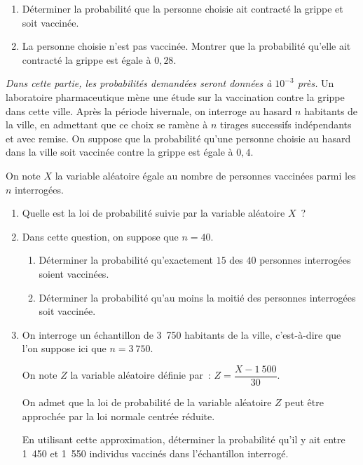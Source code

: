 \begin{enumerate}
\begin{enumerate}[label=\alph*.]
\begin{center}
\begin{extern}
               \end{extern}
          \end{center}
     \end{enumerate}
     \item Déterminer la probabilité que la personne choisie ait contracté la grippe et soit vaccinée.
     \item La personne choisie n'est pas vaccinée. Montrer que la probabilité qu'elle ait contracté la grippe est égale à $0,28$.
\end{enumerate}
\bigbreak
{}
\medbreak
\emph{Dans cette partie, les probabilités demandées seront données à $10^{-3}$ près.}
\medbreak
Un laboratoire pharmaceutique mène une étude sur la vaccination contre la grippe dans cette
ville.
\medbreak
Après la période hivernale, on interroge au hasard $n$ habitants de la ville, en admettant que ce choix se ramène à $n$ tirages successifs indépendants et avec remise. On suppose que la probabilité qu'une personne choisie au hasard dans la ville soit vaccinée contre la grippe est égale à $0,4$.
\par
On note $X$ la variable aléatoire égale au nombre de personnes vaccinées parmi les $n$
interrogées.
\medbreak
\begin{enumerate}
     \item Quelle est la loi de probabilité suivie par la variable aléatoire $X$~?
     \item Dans cette question, on suppose que $n = 40$.
     \begin{enumerate}[label=\alph*.]
          \item Déterminer la probabilité qu'exactement $15$ des $40$ personnes interrogées soient vaccinées.
          \item Déterminer la probabilité qu'au moins la moitié des personnes interrogées soit vaccinée.
     \end{enumerate}
     \item  On interroge un échantillon de 3~750 habitants de la ville, c'est-à-dire que l'on suppose ici que $n = 3~750$.
     \par
     On note $Z$ la variable aléatoire définie par~: $Z = \dfrac{X - 1~500}{30}$.
     \par
     On admet que la loi de probabilité de la variable aléatoire $Z$ peut être approchée par la
     loi normale centrée réduite.
     \par
     En utilisant cette approximation, déterminer la probabilité qu'il y ait entre 1~450 et 1~550 individus vaccinés dans l'échantillon interrogé.
\end{enumerate}
